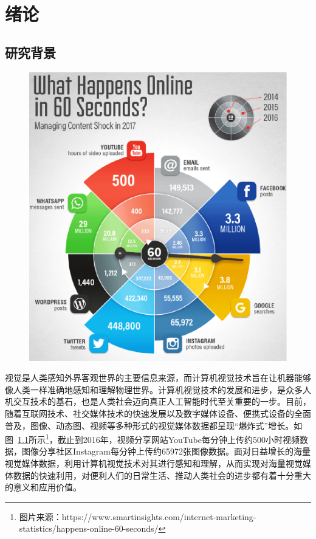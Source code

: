 \chapter{绪论}

\section{研究背景}

\begin{figure}
    \centering
        \includegraphics[width=0.95\linewidth]{chapter1/res/media_statistics.pdf}
    \label{ch1:fig:media_statistics}
\end{figure}

视觉是人类感知外界客观世界的主要信息来源，而计算机视觉技术旨在让机器能够像人类一样准确地感知和理解物理世界。计算机视觉技术的发展和进步，是众多人机交互技术的基石，也是人类社会迈向真正人工智能时代至关重要的一步。目前，随着互联网技术、社交媒体技术的快速发展以及数字媒体设备、便携式设备的全面普及，图像、动态图、视频等多种形式的视觉媒体数据都呈现“爆炸式”增长。如图~\ref{ch1:fig:media_statistics}所示\footnote{图片来源：https://www.smartinsights.com/internet-marketing-statistics/happens-online-60-seconds/}，截止到2016年，视频分享网站YouTube每分钟上传约500小时视频数据，图像分享社区Instagram每分钟上传约65972张图像数据。面对日益增长的海量视觉媒体数据，利用计算机视觉技术对其进行感知和理解，从而实现对海量视觉媒体数据的快速利用，对便利人们的日常生活、推动人类社会的进步都有着十分重大的意义和应用价值。

